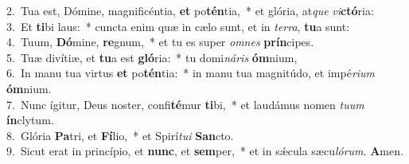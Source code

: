 {2.~}Tua est, Dómine, magnificéntia, \textbf{et} po\textbf{tén}tia,~* et glória, at\textit{que} \textit{vi}\textbf{ctó}ria:\\
{3.~}Et \textbf{ti}bi laus:~* cuncta enim quæ in cælo sunt, et in \textit{ter}\textit{ra}, \textbf{tu}a sunt:\\
{4.~}Tuum, \textbf{Dó}mine, \textbf{re}gnum,~* et tu es super \textit{om}\textit{nes} \textbf{prín}cipes.\\
{5.~}Tuæ divítiæ, et \textbf{tu}a est \textbf{gló}ria:~* tu domi\textit{ná}\textit{ris} \textbf{óm}nium,\\
{6.~}In manu tua virtus \textbf{et} po\textbf{tén}tia:~* in manu tua magnitúdo, et impé\textit{ri}\textit{um} \textbf{óm}nium.\\
{7.~}Nunc ígitur, Deus noster, confi\textbf{té}mur \textbf{ti}bi,~* et laudámus nomen \textit{tu}\textit{um} \textbf{ín}clytum.\\
{8.~}Glória \textbf{Pa}tri, et \textbf{Fí}lio,~* et Spirí\textit{tu}\textit{i} \textbf{San}cto.\\
{9.~}Sicut erat in princípio, et \textbf{nunc}, et \textbf{sem}per,~* et in sǽcula sæcu\textit{ló}\textit{rum}. \textbf{A}men.\\
